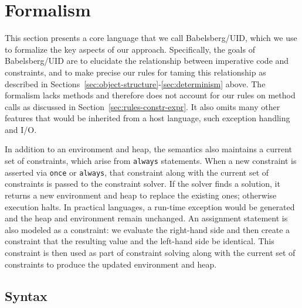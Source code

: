 \documentclass[10pt,reprint]{sigplanconf-preprint}
\begin{document}
\section{Formalism}
\label{sec:semantics}

This section presents a core language that we call Babelsberg/UID,
which we use to formalize the key aspects of our approach.
Specifically, the goals of Babelsberg/UID are to elucidate the
relationship between imperative code and constraints, and to make precise
our rules for taming this relationship as described in
Sections~\ref{sec:object-structure}-\ref{sec:determinism} above.  
The formalism lacks methods and therefore does not account for our
rules on method calls as discussed in
Section~\ref{sec:rules-constr-expr}.
It also omits many other features that would be inherited from a host
language, %
such 
exception handling and \textsc{I/O}. %

In addition to an environment and heap, the semantics also maintains a
current set of constraints, which arise from {\tt always} statements.
When a new constraint is asserted via {\tt once} or {\tt always}, that
constraint along with the current set of constraints is passed to the
constraint solver.  If the solver finds a solution, it returns a new
environment and heap to replace the existing ones; otherwise
execution halts. In
practical languages, a run-time exception would be generated and the
heap and environment remain unchanged.
An assignment statement is also modeled as a constraint:
we evaluate the right-hand side and then create a
constraint that the resulting value and the left-hand side be
identical.  This constraint is then used as part of constraint solving
along with the current set of constraints to produce the updated
environment and heap.

\subsection{Syntax}
\end{document}
